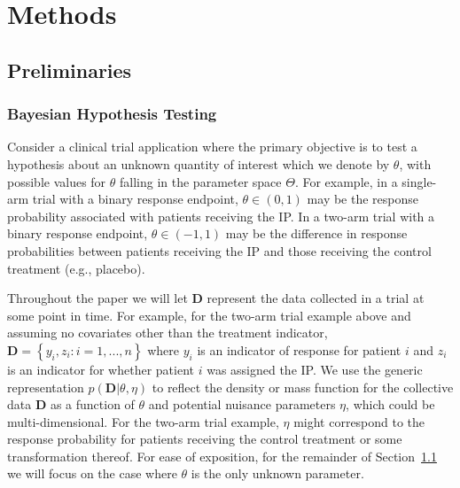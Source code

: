 \documentclass[12pt]{article}
\begin{document}
\section{Methods}\label{sec:methods}

\subsection{Preliminaries}\label{sec:preliminaries}
\subsubsection{Bayesian Hypothesis Testing}
Consider a clinical trial application where the primary objective is to test a hypothesis about an unknown quantity of interest which we denote by $\theta$, with possible values
for $\theta$ falling in the parameter space $\Theta$.
%
For example, in a single-arm trial with a binary response endpoint, $\theta \in (0,1)$ may be the response probability associated with patients receiving the IP.
%
In a two-arm trial with a binary response endpoint, $\theta \in (-1,1)$ may be the difference in response probabilities between patients receiving the IP and those receiving the control treatment (e.g., placebo).

Throughout the paper we will let $\mathbf{D}$ represent the data collected in a trial at some point in time. 
%
For example, for the two-arm trial example above and assuming no covariates other than the treatment indicator, $\mathbf{D}=\left\{y_i,z_i:i=1,...,n\right\}$ where $y_i$ is an indicator of response for patient $i$ and $z_i$ is an indicator for whether patient $i$ was assigned the IP.
%
We use the generic representation $p(\mathbf{D}|\theta,\eta)$ to reflect the density or mass function for the collective data $\mathbf{D}$ as 
a function of $\theta$ and potential nuisance parameters $\eta$, which could be multi-dimensional.
%
For the two-arm trial example, $\eta$ might correspond to the response probability for patients receiving the control treatment or some transformation thereof. 
For ease of exposition, for the remainder of Section~\ref{sec:preliminaries} we will focus on the case where $\theta$ is the only unknown parameter.
\end{document}
